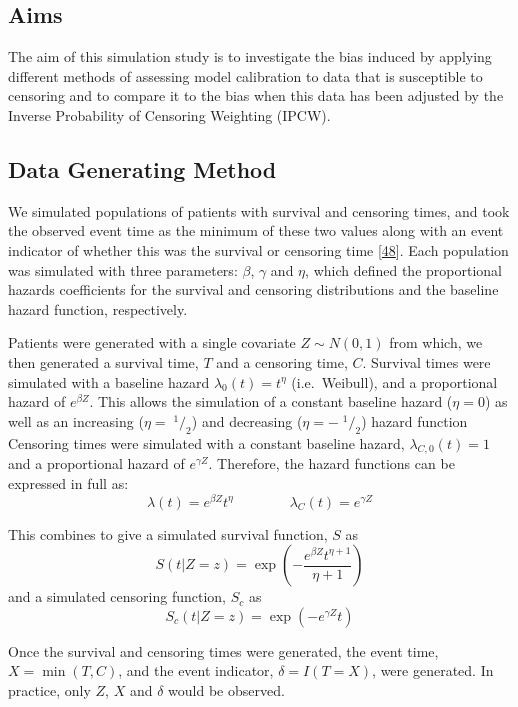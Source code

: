 \documentclass[12pt,PhD,twoside,openright]{muthesis}
\newcommand{\sfrac}[2]{\;^{#1}/_{#2}}
\begin{document}
\hypertarget{aims}{%
\subsection{Aims}\label{aims}}

The aim of this simulation study is to investigate the bias induced by applying different methods of assessing model calibration to data that is susceptible to censoring and to compare it to the bias when this data has been adjusted by the Inverse Probability of Censoring Weighting (IPCW).

\hypertarget{data-generating-method}{%
\subsection{Data Generating Method}\label{data-generating-method}}

We simulated populations of patients with survival and censoring times, and took the observed event time as the minimum of these two values along with an event indicator of whether this was the survival or censoring time {[}\protect\hyperlink{ref-burton_design_2006}{48}{]}. Each population was simulated with three parameters: \(\beta\), \(\gamma\) and \(\eta\), which defined the proportional hazards coefficients for the survival and censoring distributions and the baseline hazard function, respectively.

Patients were generated with a single covariate \(Z \sim N(0,1)\) from which, we then generated a survival time, \(T\) and a censoring time, \(C\). Survival times were simulated with a baseline hazard \(\lambda_0(t) = t^{\eta}\) (i.e.~Weibull), and a proportional hazard of \(e^{\beta Z}\). This allows the simulation of a constant baseline hazard (\(\eta = 0\)) as well as an increasing (\(\eta = \sfrac{1}{2}\)) and decreasing (\(\eta = -\sfrac{1}{2}\)) hazard function Censoring times were simulated with a constant baseline hazard, \(\lambda_{C,0}(t) = 1\) and a proportional hazard of \(e^{\gamma Z}\). Therefore, the hazard functions can be expressed in full as:
\[
\lambda(t) = e^{\beta Z}t^{\eta}\qquad\qquad\lambda_C(t)=e^{\gamma Z}
\]

This combines to give a simulated survival function, \(S\) as
\[
S(t|Z=z) = \exp\left(-\frac{e^{\beta Z}t^{\eta+1}}{\eta+1}\right)
\]
and a simulated censoring function, \(S_c\) as
\[
S_c(t|Z=z) = \exp\left(-e^{\gamma Z}t\right)
\]

Once the survival and censoring times were generated, the event time, \(X = \min(T,C)\), and the event indicator, \(\delta = I(T=X)\), were generated. In practice, only \(Z\), \(X\) and \(\delta\) would be observed.
\end{document}
